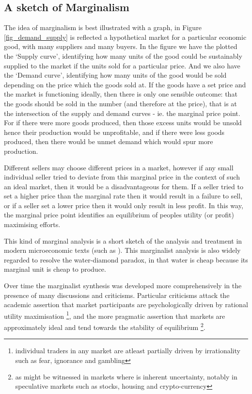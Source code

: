 \subsection{A sketch of Marginalism}\label{subsec:marginal_price_sketch}

The idea of marginalism is best illustrated with a graph, in Figure \ref{fig_demand_supply} is reflected a hypothetical market for a particular economic good, with many suppliers and many buyers.
In the figure we have the plotted the `Supply curve', identifying how many units of the good could be sustainably supplied to the market if the units sold for a particular price.
And we also have the `Demand curve', identifying how many units of the good would be sold depending on the price which the goods sold at.
If the goods have a set price and the market is functioning ideally, then there is only one sensible outcome: that the goods should be sold in the number (and therefore at the price), that is at the intersection of the supply and demand curves - ie. the marginal price point.
For if there were more goods produced, then those excess units would be unsold hence their production would be unprofitable, and if there were less goods produced, then there would be unmet demand which would spur more production.

Different sellers may choose different prices in a market, however if any small individual seller tried to deviate from this marginal price in the context of such an ideal market, then it would be a disadvantageous for them.
If a seller tried to set a higher price than the marginal rate then it would result in a failure to sell, or if a seller set a lower price then it would only result in less profit.
In this way, the marginal price point identifies an equilibrium of peoples utility (or profit) maximising efforts.

This kind of marginal analysis is a short sketch of the analysis and treatment in modern microeconomic texts (such as \cite{vohra_2020}).
This marginalist analysis is also widely regarded to resolve the water-diamond paradox, in that water is cheap because its marginal unit is cheap to produce.

Over time the marginalist synthesis was developed more comprehensively in the presence of many discussions and criticisms.
Particular criticisms attack the academic assertion that market participants are psychologically driven by rational utility maximisation \cite{RePEc:ucp:jpolec:v:58:y:1950:p:307}\footnote{individual traders in any market are atleast partially driven by irrationality such as fear, ignorance and gambling}, and the more pragmatic assertion that markets are approximately ideal and tend towards the stability of equilibrium \cite{nla.cat-vn5739105}\footnote{as might be witnessed in markets where is inherent uncertainty, notably in speculative markets such as stocks, housing and crypto-currency}.

